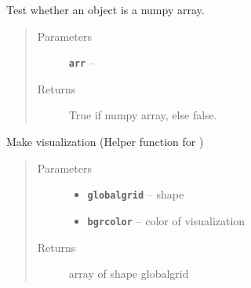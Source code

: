 \documentclass[letterpaper,10pt,english]{sphinxmanual}
\begin{document}

\begin{fulllineitems}
\label{RRtoolbox.lib.arrayops:RRtoolbox.lib.arrayops.basic.isnumpy}
Test whether an object is a numpy array.
\begin{quote}\begin{description}
\item[{Parameters}] \leavevmode
\textbf{\texttt{arr}} -- 

\item[{Returns}] \leavevmode
True if numpy array, else false.

\end{description}\end{quote}

\end{fulllineitems}


\begin{fulllineitems}
\label{RRtoolbox.lib.arrayops:RRtoolbox.lib.arrayops.basic.makeVis}
Make visualization (Helper function for {\hyperref[RRtoolbox.lib.arrayops:RRtoolbox.lib.arrayops.basic.padVH]{\emph{}}})
\begin{quote}\begin{description}
\item[{Parameters}] \leavevmode\begin{itemize}
\item {} 
\textbf{\texttt{globalgrid}} -- shape

\item {} 
\textbf{\texttt{bgrcolor}} -- color of visualization

\end{itemize}

\item[{Returns}] \leavevmode
array of shape globalgrid

\end{description}\end{quote}

\end{fulllineitems}

\end{document}
